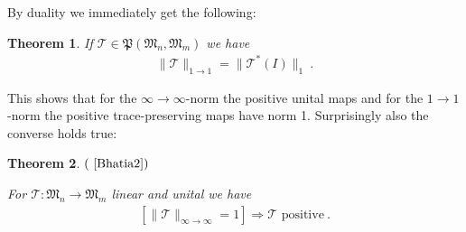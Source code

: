 \documentclass[a4paper
               ,12pt
               ,DIV=12
               ,oneside
               ]
               {amsart}
\theoremstyle{plain}
\newtheorem{thm}{Theorem}
\theoremstyle{remark}
\def\ra{\rightarrow}
\def\lb{\left(}
\def\rb{\right)}
\def\lbr{\left[}
\def\rbr{\right]}
\newcommand\M{\mathfrak{M}}
\newcommand{\Tm}{\mathcal{T}}
\begin{document}
By duality we immediately get the following:

\begin{thm}

If $\Tm\in\mathfrak{P}\lb \M_n,\M_m\rb$ we have
\begin{align*}
\| \Tm\|_{1\ra 1} = \| \Tm^{*}\lb I\rb\|_1\medspace.
\end{align*}
\label{thm:RussoDye2}
\end{thm}

This shows that for the $\infty\ra\infty$-norm the positive unital maps and for the $1\ra 1$-norm the positive trace-preserving maps have norm 1. Surprisingly also the converse holds true:

\begin{thm}$\lb\text{~\cite{Bhatia2}}\rb$

For $\Tm :\M_n\ra\M_m$ linear and unital we have
\begin{align*}
\lbr\| \Tm\|_{\infty\ra\infty} = 1\rbr \Rightarrow \Tm\text{ positive}\medspace.
\end{align*}
\label{thm:RussoDyeBack}
\end{thm} 
\end{document}
